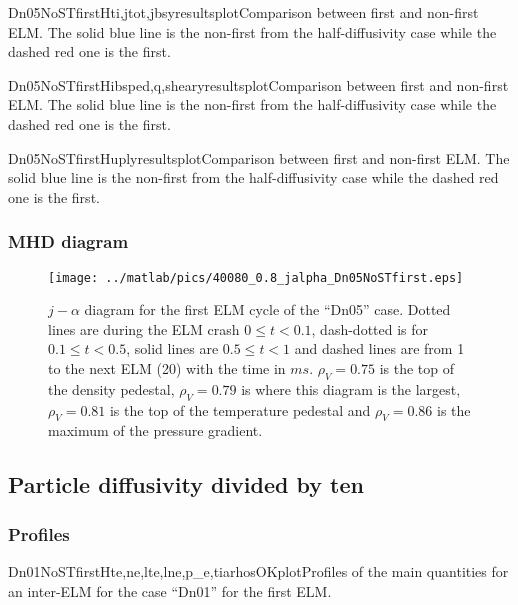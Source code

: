 \begin{AllFigs}{Dn05NoSTfirst}{H}{}{ti,jtot,jbs}{y}{resultsplot}{Comparison between first and non-first ELM. The solid blue line is the non-first from the half-diffusivity case while the dashed red one is the first.}
\end{AllFigs}
\begin{AllFigs}{Dn05NoSTfirst}{H}{}{ibsped,q,shear}{y}{resultsplot}{Comparison between first and non-first ELM. The solid blue line is the non-first from the half-diffusivity case while the dashed red one is the first.}
\end{AllFigs}
\begin{AllFigs}{Dn05NoSTfirst}{H}{}{upl}{y}{resultsplot}{Comparison between first and non-first ELM. The solid blue line is the non-first from the half-diffusivity case while the dashed red one is the first.}
\end{AllFigs}
\subsubsection{MHD diagram}\label{sec:app:graphs:recovery:first:Dn05:jalpha}
\begin{figure}[H]
\begin{center}
\texttt{[image: ../matlab/pics/40080\_0.8\_jalpha\_Dn05NoSTfirst.eps]}
\vspace{-0.5cm}
\end{center}
\caption{\footnotesize $j - \alpha$ diagram for the first ELM cycle of the ``Dn05'' case. Dotted lines are during the ELM crash $0 \le t <0.1$, dash-dotted is for $0.1 \le t < 0.5$, solid lines are $0.5 \le t < 1$ and dashed lines are from 1 to the next ELM (20) with the time in $ms$. $\rho_V = 0.75$ is the top of the density pedestal, $\rho_V = 0.79$ is where this diagram is the largest, $\rho_V = 0.81$ is the top of the temperature pedestal and $\rho_V = 0.86$ is the maximum of the pressure gradient.\label{fig:results:ELM:Dn05first:jalpha}}
\vspace{-0.5cm}
\end{figure}
\subsection{Particle diffusivity divided by ten}\label{sec:app:graphs:recovery:first:Dn01}
\subsubsection{Profiles}\label{sec:app:graphs:recovery:first:Dn01:profiles}
\begin{AllFigs}{Dn01NoSTfirst}{H}{}{te,ne,lte,lne,p_e,ti}{a}{rhosOKplot}{Profiles of the main quantities for an inter-ELM for the case ``Dn01'' for the first ELM.}
\end{AllFigs}


